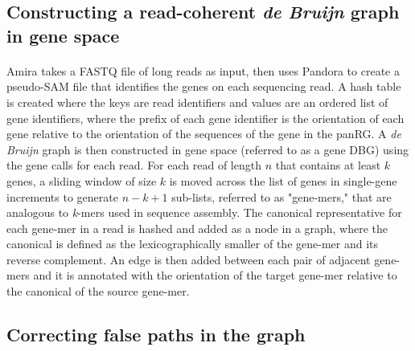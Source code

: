 \subsection*{Constructing a read-coherent \textit{de Bruijn} graph in gene space}
\paragraph{}
Amira takes a FASTQ file of long reads as input, then uses Pandora to create a pseudo-SAM file that identifies the genes on each sequencing read. A hash table is created where the keys are read identifiers and values are an ordered list of gene identifiers, where the prefix of each gene identifier is the orientation of each gene relative to the orientation of the sequences of the gene in the panRG. A \textit{de Bruijn} graph is then constructed in gene space (referred to as a gene DBG) using the gene calls for each read. For each read of length $n$ that contains at least $k$ genes, a sliding window of size $k$ is moved across the list of genes in single-gene increments to generate $n - k + 1$ sub-lists, referred to as "gene-mers," that are analogous to \textit{k}-mers used in sequence assembly. The canonical representative for each gene-mer in a read is hashed and added as a node in a graph, where the canonical is defined as the lexicographically smaller of the gene-mer and its reverse complement. An edge is then added between each pair of adjacent gene-mers and it is annotated with the orientation of the target gene-mer relative to the canonical of the source gene-mer.

\subsection*{Correcting false paths in the graph}
